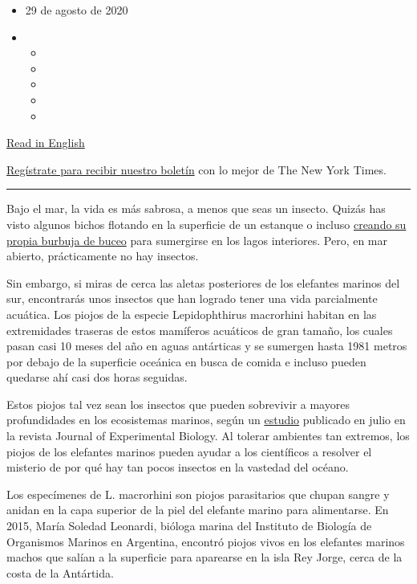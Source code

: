 \begin{itemize}
\item
  29 de agosto de 2020
\item
  \begin{itemize}
  \item
  \item
  \item
  \item
  \item
  \end{itemize}
\end{itemize}

\href{https://www.nytimes3xbfgragh.onion/2020/08/26/science/lice-elephant-seals.html}{Read
in English}

\href{https://www.nytimes3xbfgragh.onion/newsletters/el-times}{Regístrate
para recibir nuestro boletín} con lo mejor de The New York Times.

\begin{center}\rule{0.5\linewidth}{\linethickness}\end{center}

Bajo el mar, la vida es más sabrosa, a menos que seas un insecto. Quizás
has visto algunos bichos flotando en la superficie de un estanque o
incluso
\href{https://www.nytimes3xbfgragh.onion/2017/11/21/science/diving-flies-mono-lake.html}{creando
su propia burbuja de buceo} para sumergirse en los lagos interiores.
Pero, en mar abierto, prácticamente no hay insectos.

Sin embargo, si miras de cerca las aletas posteriores de los elefantes
marinos del sur, encontrarás unos insectos que han logrado tener una
vida parcialmente acuática. Los piojos de la especie Lepidophthirus
macrorhini habitan en las extremidades traseras de estos mamíferos
acuáticos de gran tamaño, los cuales pasan casi 10 meses del año en
aguas antárticas y se sumergen hasta 1981 metros por debajo de la
superficie oceánica en busca de comida e incluso pueden quedarse ahí
casi dos horas seguidas.

Estos piojos tal vez sean los insectos que pueden sobrevivir a mayores
profundidades en los ecosistemas marinos, según un
\href{https://jeb.biologists.org/content/early/2020/07/16/jeb.226811}{estudio}
publicado en julio en la revista Journal of Experimental Biology. Al
tolerar ambientes tan extremos, los piojos de los elefantes marinos
pueden ayudar a los científicos a resolver el misterio de por qué hay
tan pocos insectos en la vastedad del océano.

Los especímenes de L. macrorhini son piojos parasitarios que chupan
sangre y anidan en la capa superior de la piel del elefante marino para
alimentarse. En 2015, María Soledad Leonardi, bióloga marina del
Instituto de Biología de Organismos Marinos en Argentina, encontró
piojos vivos en los elefantes marinos machos que salían a la superficie
para aparearse en la isla Rey Jorge, cerca de la costa de la Antártida.

